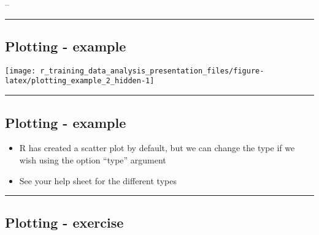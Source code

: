 \documentclass[]{article}
\newenvironment{Shaded}{\begin{snugshade}}{\end{snugshade}}
\newcommand{\DataTypeTok}[1]{\textcolor[rgb]{0.13,0.29,0.53}{#1}}
\newcommand{\KeywordTok}[1]{\textcolor[rgb]{0.13,0.29,0.53}{\textbf{#1}}}
\newcommand{\NormalTok}[1]{#1}
\newcommand{\OperatorTok}[1]{\textcolor[rgb]{0.81,0.36,0.00}{\textbf{#1}}}
\providecommand{\tightlist}{%
  \setlength{\itemsep}{0pt}\setlength{\parskip}{0pt}}
\begin{document}
--

\begin{Shaded}
\end{Shaded}

\begin{center}\rule{0.5\linewidth}{\linethickness}\end{center}

\hypertarget{plotting---example-4}{%
\subsection{Plotting - example}\label{plotting---example-4}}

\begin{center}\texttt{[image: r\_training\_data\_analysis\_presentation\_files/figure-latex/plotting\_example\_2\_hidden-1]} \end{center}

\begin{center}\rule{0.5\linewidth}{\linethickness}\end{center}

\hypertarget{plotting---example-5}{%
\subsection{Plotting - example}\label{plotting---example-5}}

\begin{itemize}
\tightlist
\item
  R has created a scatter plot by default, but we can change the type if
  we wish using the option ``type'' argument
\item
  See your help sheet for the different types
\end{itemize}

\begin{center}\rule{0.5\linewidth}{\linethickness}\end{center}

\hypertarget{plotting---exercise}{%
\subsection{Plotting - exercise}\label{plotting---exercise}}
\end{document}
